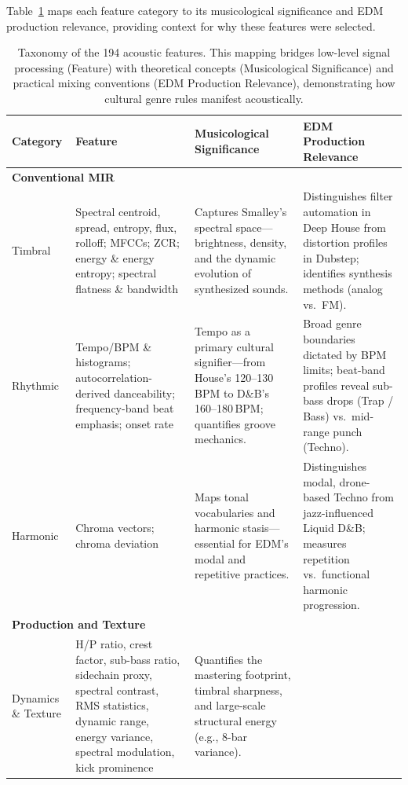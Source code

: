 \documentclass{article}
\begin{document}
	Table~\ref{tab:feature_taxonomy} maps each feature category to its musicological significance and EDM production relevance, providing context for why these features were selected.

	\begin{table}[t]
		\centering\small
		\caption{Taxonomy of the 194 acoustic features. This mapping bridges low-level signal processing (Feature) with theoretical concepts (Musicological Significance) and practical mixing conventions (EDM Production Relevance), demonstrating how cultural genre rules manifest acoustically.}
		\label{tab:feature_taxonomy}
		\begin{tabular}{p{1.9cm}p{4.3cm}p{4.2cm}p{4.4cm}}
			\toprule
			\textbf{Category} & \textbf{Feature} & \textbf{Musicological Significance} & \textbf{EDM Production Relevance} \\
			\midrule
			\multicolumn{4}{l}{\textbf{Conventional MIR}} \\
			\midrule
			Timbral & Spectral centroid, spread, entropy, flux, rolloff; MFCCs; ZCR; energy \& energy entropy; spectral flatness \& bandwidth
			& Captures Smalley's spectral space---brightness, density, and the dynamic evolution of synthesized sounds.
			& Distinguishes filter automation in Deep House from distortion profiles in Dubstep; identifies synthesis methods (analog vs.\ FM). \\
			\addlinespace
			Rhythmic & Tempo/BPM \& histograms; autocorrelation-derived danceability; frequency-band beat emphasis; onset rate
			& Tempo as a primary cultural signifier---from House's 120--130\,BPM to D\&B's 160--180\,BPM; quantifies groove mechanics.
			& Broad genre boundaries dictated by BPM limits; beat-band profiles reveal sub-bass drops (Trap / Bass) vs.\ mid-range punch (Techno). \\
			\addlinespace
			Harmonic & Chroma vectors; chroma deviation
			& Maps tonal vocabularies and harmonic stasis---essential for EDM's modal and repetitive practices.
			& Distinguishes modal, drone-based Techno from jazz-influenced Liquid D\&B; measures repetition vs.\ functional harmonic progression. \\
			\midrule
			\multicolumn{4}{l}{\textbf{Production and Texture}} \\
			\midrule
			Dynamics \& Texture & H/P ratio, crest factor, sub-bass ratio, sidechain proxy, spectral contrast, RMS statistics, dynamic range, energy variance, spectral modulation, kick prominence
			& Quantifies the mastering footprint, timbral sharpness, and large-scale structural energy (e.g., 8-bar variance).

\end{tabular}
\end{table}
\end{document}
